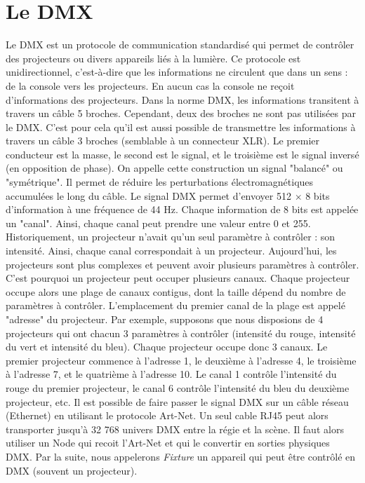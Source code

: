 \section{Le DMX}
\label{sec:dmx}

Le DMX est un protocole de communication standardisé qui permet de contrôler des projecteurs ou divers appareils liés à la lumière.
\newline
Ce protocole est unidirectionnel, c'est-à-dire que les informations ne circulent que dans un sens : de la console vers les projecteurs. En aucun cas la console ne reçoit d'informations des projecteurs.
\newline
\newline
Dans la norme DMX, les informations transitent à travers un câble 5 broches. Cependant, deux des broches ne sont pas utilisées par le DMX. C'est pour cela qu'il est aussi possible de transmettre les informations à travers un câble 3 broches (semblable à un connecteur XLR).
\newline
Le premier conducteur est la masse, le second est le signal, et le troisième est le signal inversé (en opposition de phase). On appelle cette construction un signal "balancé" ou "symétrique". Il permet de réduire les perturbations électromagnétiques accumulées le long du câble.
\newline
\newline
Le signal DMX permet d'envoyer 512 $\times$ 8 bits d'information à une fréquence de 44 Hz.
Chaque information de 8 bits est appelée un "canal". Ainsi, chaque canal peut prendre une valeur entre 0 et 255.
\newline
Historiquement, un projecteur n'avait qu'un seul paramètre à contrôler : son intensité. Ainsi, chaque canal correspondait à un projecteur.
Aujourd'hui, les projecteurs sont plus complexes et peuvent avoir plusieurs paramètres à contrôler. C'est pourquoi un projecteur peut occuper plusieurs canaux.
Chaque projecteur occupe alors une plage de canaux contigus, dont la taille dépend du nombre de paramètres à contrôler. L'emplacement du premier canal de la plage est appelé "adresse" du projecteur.
\newline
Par exemple, supposons que nous disposions de 4 projecteurs qui ont chacun 3 paramètres à contrôler (intensité du rouge, intensité du vert et intensité du bleu). Chaque projecteur occupe donc 3 canaux. Le premier projecteur commence à l'adresse 1, le deuxième à l'adresse 4, le troisième à l'adresse 7, et le quatrième à l'adresse 10.
Le canal 1 contrôle l'intensité du rouge du premier projecteur, le canal 6 contrôle l'intensité du bleu du deuxième projecteur, etc.
\newline
\newline
Il est possible de faire passer le signal DMX sur un câble réseau (Ethernet) en utilisant le protocole Art-Net.
Un seul cable RJ45 peut alors transporter jusqu'à 32 768 univers DMX entre la régie et la scène.
\newline
Il faut alors utiliser un Node qui recoit l'Art-Net et qui le convertir en sorties physiques DMX.
\newline
\newline
Par la suite, nous appelerons \textit{Fixture} un appareil qui peut être contrôlé en DMX (souvent un projecteur).
